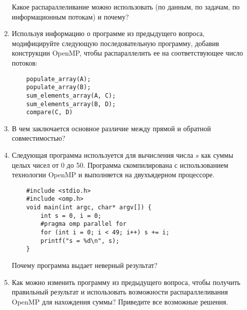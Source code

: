 \begin{enumerate}
    Какое распараллеливание можно использовать (по данным, по задачам, по информационным потокам) и почему?



    \item Используя информацию о программе из предыдущего вопроса, модифицируйте следующую последовательную программу, добавив конструкции OpenMP, чтобы распараллелить ее на соответствующее число потоков:
    \begin{verbatim}
    populate_array(A);
    populate_array(B);
    sum_elements_array(A, C);
    sum_elements_array(B, D);
    compare(C, D)
    \end{verbatim}
   
    
    \item В чем заключается основное различие между прямой и обратной совместимостью?

    
    \item Следующая программа используется для вычисления числа $s$ как суммы целых чисел от 0 до 50. Программа скомпилирована с использованием технологии OpenMP и выполняется на двухъядерном процессоре.

    \begin{verbatim}
    #include <stdio.h>
    #include <omp.h>
    void main(int argc, char* argv[]) {
        int s = 0, i = 0;
        #pragma omp parallel for
        for (int i = 0; i < 49; i++) s += i;
        printf("s = %d\n", s);
    }
    \end{verbatim}
    
    
    Почему программа выдает неверный результат?

    \item Как можно изменить программу из предыдущего вопроса, чтобы получить правильный результат и использовать возможности распараллеливания OpenMP для нахождения суммы? Приведите все возможные решения.
    

\end{enumerate}
